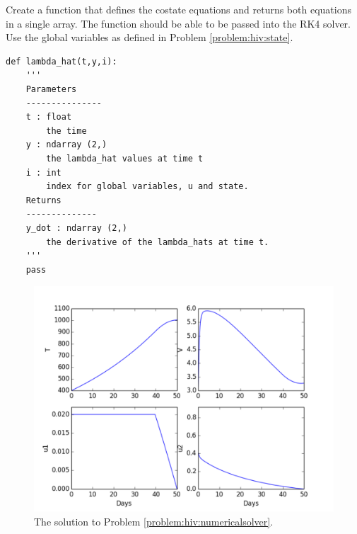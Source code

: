 \begin{problem}
Create a function that defines the costate equations and returns both equations in a single array. The function should be able to be passed into the RK4 solver. Use the global variables as defined in Problem \ref{problem:hiv:state}.

\begin{lstlisting}
def lambda_hat(t,y,i):
	'''
	Parameters
	---------------
	t : float
		the time
	y : ndarray (2,)
		the lambda_hat values at time t
	i : int
		index for global variables, u and state.
	Returns
	--------------
	y_dot : ndarray (2,)
		the derivative of the lambda_hats at time t.
	'''
	pass
\end{lstlisting}

\label{problem:hiv:costateequations}
\end{problem}


\begin{figure}
\centering
\includegraphics[width=5in]{solutions.pdf}
\caption{The solution to Problem \ref{problem:hiv:numericalsolver}.}
\label{fig:hiv:solutions}
\end{figure}



